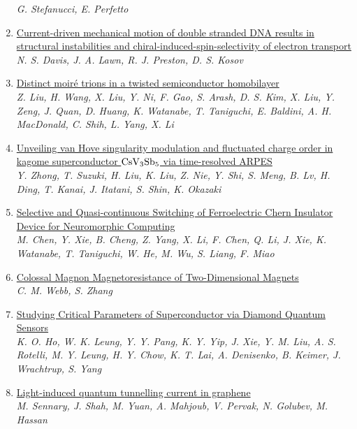 \documentclass{article}
\begin{document}
\begin{enumerate}
{\small\color{blue}\textsl{G. Stefanucci, E. Perfetto}}
\item\href{http://arxiv.org/abs/2407.17056v1}{\textsf{Current-driven mechanical motion of double stranded DNA results in
  structural instabilities and chiral-induced-spin-selectivity of electron
  transport}}\\
{\small\color{blue}\textsl{N. S. Davis, J. A. Lawn, R. J. Preston, D. S. Kosov}}
\item\href{http://arxiv.org/abs/2407.17025v1}{\textsf{Distinct moiré trions in a twisted semiconductor homobilayer}}\\
{\small\color{blue}\textsl{Z. Liu, H. Wang, X. Liu, Y. Ni, F. Gao, S. Arash, D. S. Kim, X. Liu, Y. Zeng, J. Quan, D. Huang, K. Watanabe, T. Taniguchi, E. Baldini, A. H. MacDonald, C. Shih, L. Yang, X. Li}}
\item\href{http://arxiv.org/abs/2407.17015v1}{\textsf{Unveiling van Hove singularity modulation and fluctuated charge order in
  kagome superconductor $\rm{CsV_3Sb_5}$ via time-resolved ARPES}}\\
{\small\color{blue}\textsl{Y. Zhong, T. Suzuki, H. Liu, K. Liu, Z. Nie, Y. Shi, S. Meng, B. Lv, H. Ding, T. Kanai, J. Itatani, S. Shin, K. Okazaki}}
\item\href{http://arxiv.org/abs/2407.17010v1}{\textsf{Selective and Quasi-continuous Switching of Ferroelectric Chern
  Insulator Device for Neuromorphic Computing}}\\
{\small\color{blue}\textsl{M. Chen, Y. Xie, B. Cheng, Z. Yang, X. Li, F. Chen, Q. Li, J. Xie, K. Watanabe, T. Taniguchi, W. He, M. Wu, S. Liang, F. Miao}}
\item\href{http://arxiv.org/abs/2407.16858v1}{\textsf{Colossal Magnon Magnetoresistance of Two-Dimensional Magnets}}\\
{\small\color{blue}\textsl{C. M. Webb, S. Zhang}}
\item\href{http://arxiv.org/abs/2407.16848v1}{\textsf{Studying Critical Parameters of Superconductor via Diamond Quantum
  Sensors}}\\
{\small\color{blue}\textsl{K. O. Ho, W. K. Leung, Y. Y. Pang, K. Y. Yip, J. Xie, Y. M. Liu, A. S. Rotelli, M. Y. Leung, H. Y. Chow, K. T. Lai, A. Denisenko, B. Keimer, J. Wrachtrup, S. Yang}}
\item\href{http://arxiv.org/abs/2407.16810v1}{\textsf{Light-induced quantum tunnelling current in graphene}}\\
{\small\color{blue}\textsl{M. Sennary, J. Shah, M. Yuan, A. Mahjoub, V. Pervak, N. Golubev, M. Hassan}}

\end{enumerate}
\end{document}
